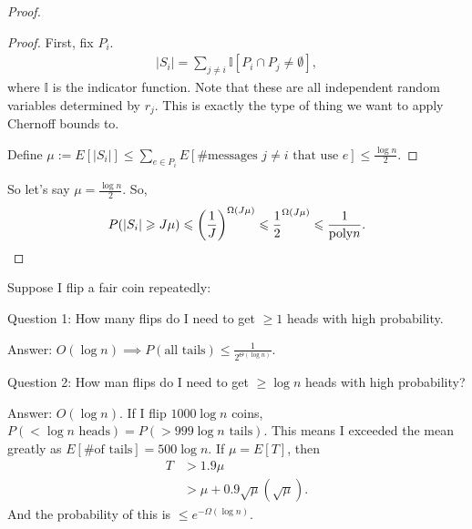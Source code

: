 \documentclass{report}
\begin{document}
\begin{proof}
    \begin{proof}
        First, fix $P_i$. 
        \begin{align*}
            |S_i| = \sum_{j \neq i} \mathbb I [P_i \cap P_j \neq \emptyset],
        \end{align*}
        where $\mathbb I$ is the indicator function. Note that these are all independent random variables determined by $r_j$. This is exactly the type of thing we want to apply Chernoff bounds to. 

        Define $\mu := E[|S_i|] \leq \sum_{e \in P_i} E[\text{\# messages $j\neq i$ that use $e$}] \leq \frac{\log n}{2}$. 
    \end{proof}
    So let's say $\mu = \frac{\log n}{2}$. So,
    \begin{align*}
        P(|S_i| \geqslant J\mu) \leqslant \left( \frac 1J \right)^{\Omega(J\mu)} \leqslant \frac 12^{\Omega(J \mu)} \leqslant \frac{1}{\text{poly} n}.
    \end{align*}
\end{proof}
\newpage 
\noindent Suppose I flip a fair coin repeatedly:

\noindent Question 1: How many flips do I need to get $\geq 1$ heads with high probability. 

\noindent Answer: $O(\log n) \implies P(\text{all tails}) \leq \frac{1}{2^{\Theta (\log n)}}$.

\noindent Question 2: How man flips do I need to get $\geq \log n$ heads with high probability?

\noindent Answer: $O(\log n)$. If I flip $1000 \log n$ coins, $P(\text{$< \log n$ heads}) = P(> 999 \log n \text{ tails})$. This means I exceeded the mean greatly as $E[\text{\# of tails}] = 500 \log n$. If $\mu = E[T]$, then
\begin{align*}
    T &> 1.9 \mu \\
    &> \mu + 0.9 \sqrt \mu ( \sqrt \mu).
\end{align*}
And the probability of this is $\leq e^{-\Omega(\log n)}$.
\end{document}
